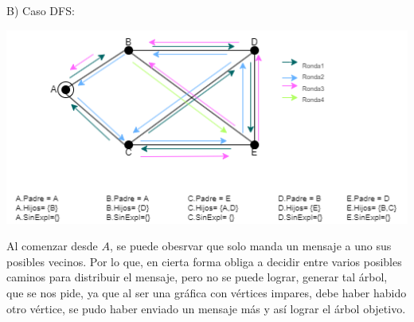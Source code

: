 B) Caso DFS:\\
    \begin{center}
        \includegraphics[scale=0.8]{grapho2.png}
    \end{center}

Al comenzar desde $A$, se puede obesrvar que solo manda un
mensaje a uno sus posibles vecinos. Por lo que, en cierta forma
obliga a decidir entre varios posibles caminos para distribuir
el mensaje, pero no se puede lograr, generar tal árbol, que se
nos pide, ya que al ser una gráfica con vértices impares, debe haber
habido otro vértice, se pudo haber enviado un mensaje más y así lograr
el árbol objetivo.
